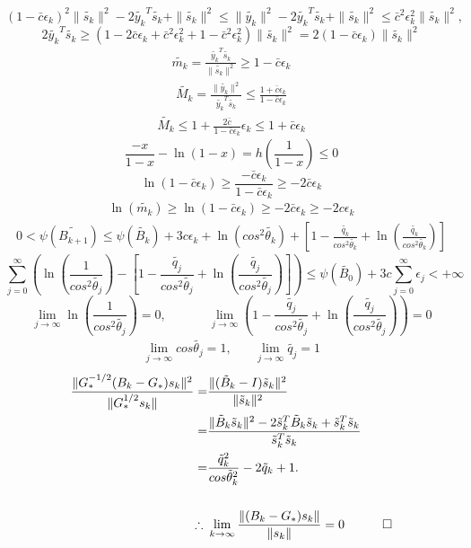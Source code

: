 \documentclass[12pt]{article}
\newcommand{\beas}{\begin{eqnarray*}}
\newcommand{\eeas}{\end{eqnarray*}}
\begin{document}
\[
  (1 - \bar{c} \epsilon_k)^2 \| \tilde{s_{k}} \|^2 - 2 \tilde{y_{k}}^T \tilde{s_{k}} + \| \tilde{s_{k}} \|^2 \leq \| \tilde{y_{k}} \|^2 - 2 \tilde{y_{k}}^T \tilde{s_{k}} +  \| \tilde{s_{k}} \|^2 \leq \bar{c}^2 \epsilon_{k}^2 \| \tilde{s_{k}} \|^2,
\]
\[
2 \tilde{y_{k}}^T \tilde{s_{k}} \geq (1 - 2 \bar{c} \epsilon_k + \bar{c}^2 \epsilon_{k}^2 + 1 - \bar{c}^2 \epsilon_{k}^2) \| \tilde{s_{k}} \|^2 = 2 (1 - \bar{c} \epsilon_k)\| \tilde{s_{k}} \|^2 
\]
\beas  
\tilde{m_{k}} = \frac{\tilde{y_{k}}^T  \tilde{s_{k}}}{\| \tilde{s_{k}} \|^2 } \geq 1 - \bar{c} \epsilon_k
\eeas
\beas  
\tilde{M_{k}} = \frac{\| \tilde{y_{k}} \|^2 }{\tilde{y_{k}}^T  \tilde{s_{k}}} \leq \frac{1 + \bar{c} \epsilon_k}{1 - \bar{c} \epsilon_k}
\eeas
\beas 
\tilde{M_{k}} \leq 1 + \frac{2 \bar{c}}{1 - \bar{c} \epsilon_k} \epsilon_k \leq 1 + \bar{c} \epsilon_k
\eeas
\[
\frac{-x}{1-x}-\ln(1-x)=h\left(\frac{1}{1-x}\right)\leq 0
\]
\[
\ln(1-\bar{c}\epsilon_k) \geq \frac{-\bar{c}\epsilon_k}{1-\bar{c}\epsilon_k} \geq -2\bar{c}\epsilon_k
\]
\beas 
\ln( \tilde{m_k} )\geq \ln(1-\bar{c}\epsilon_k) \geq -2\bar{c}\epsilon_k \geq -2c\epsilon_k
\eeas
\beas 
0<\psi(\tilde{B_{k+1}}) \leq \psi(\tilde{B_{k}}) + 3c\epsilon_k + \ln(cos^2\tilde{\theta_k} )+ \left[ 1- \frac{\tilde{q_k}}{cos^2\tilde{\theta_k}} + \ln\left(\frac{\tilde{q_k}}{cos^2\tilde{\theta_k}}\right) \right]
\eeas
\[
\sum\limits_{j=0}^\infty \left(\ln\left(\frac{1}{cos^2\tilde{\theta_j}}\right) - \left[ 1- \frac{\tilde{q_j}}{cos^2\tilde{\theta_j}} + \ln\left(\frac{\tilde{q_j}}{cos^2\tilde{\theta_j}}\right) \right]\right) \leq \psi(\tilde{B_0})+3c\sum\limits_{j=0}^\infty \epsilon_j < +\infty
\]
\[
\lim_{j\to\infty} \ln\left( \frac{1}{cos^2\tilde{\theta_j}}\right)=0, \ \ \ \ \ \ \ \ \ \ \ \ \ \ \ 
\lim_{j\to\infty} \left( 1- \frac{\tilde{q_j}}{cos^2\tilde{\theta_j}} + \ln\left(\frac{\tilde{q_j}}{cos^2\tilde{\theta_j}} \right)\right) = 0
\]
\beas 
\lim_{j\to\infty} cos\tilde{\theta_j}=1,  \ \ \ \ \ \ \ \ 
\lim_{j\to\infty} \tilde{q_j}=1
\eeas
\beas
\frac{ \| G_{*} ^{-1/2} (B_k - G_{*}) s_k \|^2 }{ \|  G_{*} ^{1/2} s_k \|} =& \frac{ \| (\tilde{B}_{k} - I) \tilde{s}_{k} \|^2 }{ \|  \tilde{s}_{k} \|^2} \\
\ =& \frac{ \| \tilde{B}_{k} \tilde{s}_{k} \|^2 - 2 \tilde{s}_{k}^T \tilde{B}_{k} \tilde{s}_{k} + \tilde{s}_{k}^T \tilde{s}_{k} }{ \tilde{s}_{k}^T  \tilde{s}_{k}} \\
\ =& \frac{\tilde{q}_{k} ^2 }{ cos \tilde{\theta}_{k}^2 } - 2 \tilde{q}_{k} + 1.\\ \\ 
 \therefore\ & \lim_{k \to \infty} \frac{\| (B_k - G_{*}) s_k \|}{\| s_k \|} = 0 \ \ \ \qed\\
\eeas


\enddocument
\end{document}
